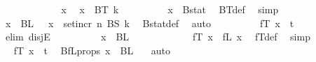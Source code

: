 \begin{isabellebody}
\ \ \ \ \isamarkupfalse%
\isanewline
\ \ \ \ \ \ \isamarkupfalse%
\ x\ \isamarkupfalse%
\ {\isachardoublequoteopen}x\ {\isasymin}\ BT\ {\isacharparenleft}{\kern0pt}k{\isacharplus}{\kern0pt}{}{\isacharparenright}{\kern0pt}{\isachardoublequoteclose}\isanewline
\ \ \ \ \ \ \isamarkupfalse%
\ \isamarkupfalse%
\ {\isachardoublequoteopen}x\ {\isasymin}\ Bstat{\isachardoublequoteclose}\ \isamarkupfalse%
\ BT{\isacharunderscore}{\kern0pt}def\ \isamarkupfalse%
\ simp\isanewline
\ \ \ \ \ \ \isamarkupfalse%
\ \isamarkupfalse%
\ {\isachardoublequoteopen}x\ {\isasymin}\ BL\ {}\ {\isasymor}\ x\ {\isasymin}\ set{\isacharunderscore}{\kern0pt}incr\ n\ {\isacharparenleft}{\kern0pt}BS\ k{\isacharparenright}{\kern0pt}{\isachardoublequoteclose}\ \isamarkupfalse%
\ Bstat{\isacharunderscore}{\kern0pt}def\ \isamarkupfalse%
\ auto\isanewline
\ \ \ \ \ \ \isamarkupfalse%
\ \isamarkupfalse%
\ {\isachardoublequoteopen}fT\ x\ {\isasymin}\ {\isacharbraceleft}{\kern0pt}{\isachardot}{\kern0pt}{\isachardot}{\kern0pt}{\isacharless}{\kern0pt}t\ {\isacharplus}{\kern0pt}\ {}{\isacharbraceright}{\kern0pt}{\isachardoublequoteclose}\isanewline
\ \ \ \ \ \ \isamarkupfalse%
\ {\isacharparenleft}{\kern0pt}elim\ disjE{\isacharparenright}{\kern0pt}\isanewline
\ \ \ \ \ \ \ \ \isamarkupfalse%
\ {\isachardoublequoteopen}x\ {\isasymin}\ BL\ {}{\isachardoublequoteclose}\isanewline
\ \ \ \ \ \ \ \ \isamarkupfalse%
\ \isamarkupfalse%
\ {\isachardoublequoteopen}fT\ x\ {\isacharequal}{\kern0pt}\ fL\ x{\isachardoublequoteclose}\ \isamarkupfalse%
\ fT{\isacharunderscore}{\kern0pt}def\ \isamarkupfalse%
\ simp\isanewline
\ \ \ \ \ \ \ \ \isamarkupfalse%
\ \isamarkupfalse%
\ {\isachardoublequoteopen}fT\ x\ {\isasymin}\ {\isacharbraceleft}{\kern0pt}{\isachardot}{\kern0pt}{\isachardot}{\kern0pt}{\isacharless}{\kern0pt}t{\isacharplus}{\kern0pt}{}{\isacharbraceright}{\kern0pt}{\isachardoublequoteclose}\ \isamarkupfalse%
\ BfL{\isacharunderscore}{\kern0pt}props\ {\isacartoucheopen}x\ {\isasymin}\ BL\ {}{\isacartoucheclose}\ \isamarkupfalse%
\ auto\isanewline
\ \ \ \ \ \ \isamarkupfalse%
\isanewline
\ \ \ \ \ \ \ \ \isamarkupfalse%

\end{isabellebody}

